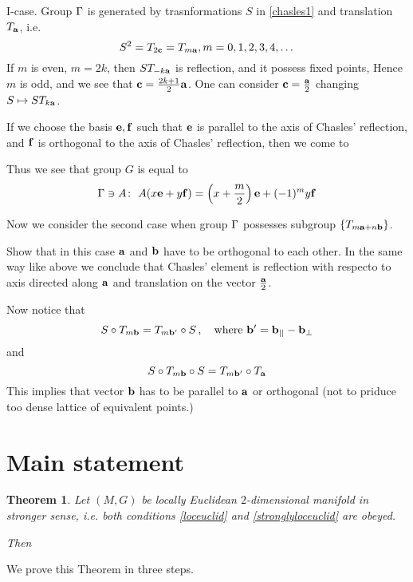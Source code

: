 \documentclass[12pt]{article}
\theoremstyle{theorem}
\newtheorem{thm}{Theorem}
\theoremstyle{lemma}
\numberwithin{equation}{section}
\begin{document}
  I-case. Group ${\Gamma}$ is generated by trasnformations
$S$ in \eqref{chasles1}  and translation $T_{{\bf a}}$,
i.e.  
       $$
  S^2=T_{2{\bf c }}=T_{m{\bf a}}, m=0,1,2,3,4,\dots
       $$    
If $m$ is even, $m=2k$, then $ST_{-k{\bf a}}$ is reflection,
and it possess fixed points,
Hence $m$ is odd, and we see that ${\bf c }={2k+1\over 2}{\bf a}$.
One can consider ${\bf c }={{\bf a}\over 2}$ changing $S\mapsto ST_{k{\bf a}}$.

If we choose the basis ${{\bf e},{\bf f}}$ such that
  ${\bf e}$ is parallel to the axis of Chasles' reflection, and
${\bf f}$ is orthogonal to the axis of Chasles' reflection, then
we come to

Thus we see that
       group $G$ is equal to
       \begin{equation*}
 {\Gamma} \ni A\colon\,\, A(x{\bf e}+y{\bf f})=\left(x+{m\over 2}\right){\bf e}+
           (-1)^my{\bf f}
      \end{equation*}


  Now we consider the second case when
  group ${\Gamma}$ possesses subgroup $\{T_{m{\bf a}+n{\bf b}}\}$.

  Show that in this case ${\bf a}$ and ${\bf b}$ have to be orthogonal
to each other. In the same way like above we conclude that
Chasles' element is reflection with respecto to axis directed
along ${\bf a}$ and translation on the vector ${\bf a}\over 2$.

Now notice that
        \begin{equation*}
         S\circ T_{m{\bf b}}=T_{m{\bf b}'}\circ S\,,\quad
   {\rm where}\,\, {\bf b}'={\bf b}_{||}-{\bf b}_\perp
         \end{equation*}
and
        \begin{equation*}
         S\circ T_{m{\bf b}}\circ S=T_{m{\bf b}'}\circ T_{{\bf a}}
         \end{equation*}
This implies that vector ${\bf b}$ has to be parallel to ${\bf a}$
or orthogonal (not to priduce too dense lattice of 
equivalent points.)

  

\section{Main statement}

\begin{thm}
Let  $(M,G)$ be locally Euclidean $2$-dimensional manifold
in stronger sense, i.e. both conditions
\eqref{loceuclid} and \eqref{stronglyloceuclid} are obeyed.


Then  
\end{thm}

  We prove this Theorem in three steps.
\end{document}
